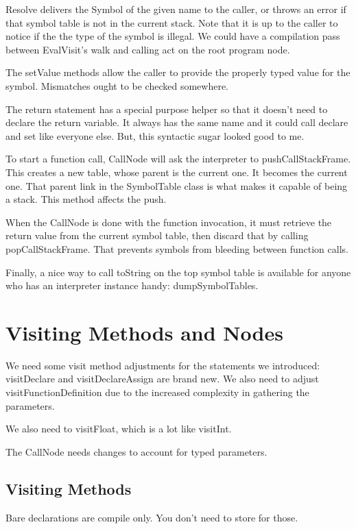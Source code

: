 Resolve delivers the Symbol of the given name to the caller, or throws an
error if that symbol table is not in the current stack. Note that it is
up to the caller to notice if the the type of the symbol is illegal.
We could have a compilation pass between EvalVisit's walk and calling
act on the root program node.

The setValue methods allow the caller to provide the properly typed value
for the symbol. Mismatches ought to be checked somewhere.

The return statement has a special purpose helper so that it doesn't need
to declare the return variable. It always has the same name and it
could call declare and set like everyone else. But, this syntactic sugar
looked good to me.

To start a function call, CallNode will ask the interpreter to pushCallStackFrame.
This creates a new table, whose parent is the current one. It becomes the
current one. That parent link in the SymbolTable class is what makes it
capable of being a stack. This method affects the push.

When the CallNode is done with the function invocation, it must retrieve
the return value from the current symbol table, then discard that by
calling popCallStackFrame. That prevents symbols from bleeding
between function calls.

Finally, a nice way to call toString on the top symbol table is available
for anyone who has an interpreter instance handy: dumpSymbolTables.

\section{Visiting Methods and Nodes}

We need some visit method adjustments for the statements we introduced:
visitDeclare and visitDeclareAssign are brand new. We also need to adjust
visitFunctionDefinition due to the increased complexity in gathering the
parameters.

We also need to visitFloat, which is a lot like visitInt.

The CallNode needs changes to account for typed parameters.

\subsection{Visiting Methods}

Bare declarations are compile only. You don't need to store for those.

